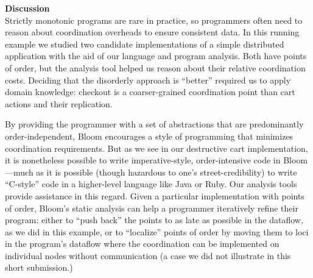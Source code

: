 
\noindent
\textbf{Discussion}\\
\noindent
Strictly monotonic programs
are rare in practice, so programmers often need to reason about coordination overheads to ensure consistent data.  In this running example we studied
two candidate implementations of a simple distributed application with the aid of
our language and program analysis. Both have points of order, but the analysis tool helped us reason about their relative coordination costs.  Deciding that the disorderly
approach is ``better'' required us to apply domain knowledge: checkout is a coarser-grained coordination point than cart actions and their replication.

By providing the programmer with a set of abstractions that are predominantly
order-independent, Bloom encourages a style of programming that minimizes
coordination requirements.  But as we see in our destructive cart
implementation, it is nonetheless possible to write imperative-style,
order-intensive code in Bloom---much as it is possible (though hazardous to one's street-credibility) to write ``C-style'' code in a higher-level language like Java or Ruby.  Our analysis tools provide assistance
in this regard.  Given a particular implementation with points of order,
Bloom's static analysis can help a programmer iteratively refine their program:
either to ``push back'' the points to as late as possible in the dataflow, as
we did in this example, or to ``localize'' points of order by moving them to
loci in the program's dataflow where the coordination can be implemented on
individual nodes without communication (a case we did not illustrate in this short submission.)
